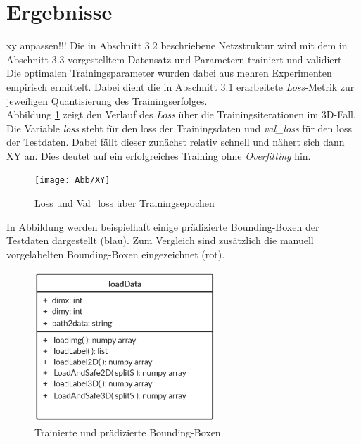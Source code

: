 \section{Ergebnisse}
xy anpassen!!!
Die in Abschnitt 3.2 beschriebene Netzstruktur wird mit dem in Abschnitt 3.3 vorgestelltem Datensatz und Parametern trainiert und validiert. Die optimalen Trainingsparameter wurden dabei aus mehren Experimenten empirisch ermittelt. Dabei dient die in Abschnitt 3.1 erarbeitete \textit{Loss}-Metrik zur jeweiligen Quantisierung des Trainingserfolges. \\Abbildung \ref{lossbild} zeigt den Verlauf des \textit{Loss} über die Trainingsiterationen im 3D-Fall. Die Variable \textit{loss} steht für den loss der Trainingsdaten und \textit{val_loss} für den loss der Testdaten. Dabei fällt dieser zunächst relativ schnell und nähert sich dann XY an. Dies deutet auf ein erfolgreiches Training ohne \textit{Overfitting} hin.\\
\begin{figure}[!htb] %
  \centering
  \texttt{[image: Abb/XY]}
  \caption{Loss und Val_loss über Trainingsepochen}
  \label{lossbild}
\end{figure} 
In Abbildung werden beispielhaft einige prädizierte Bounding-Boxen der Testdaten dargestellt (blau). Zum Vergleich sind zusätzlich die manuell vorgelabelten Bounding-Boxen eingezeichnet (rot).  \label{pred_boxes}
\begin{figure}[!htb]
  \centering
  \includegraphics[width=6.8cm]{Abb/ULM_class_loadData.PNG}
  \caption{Trainierte und prädizierte Bounding-Boxen}
  \label{pred_boxes}
\end{figure} 